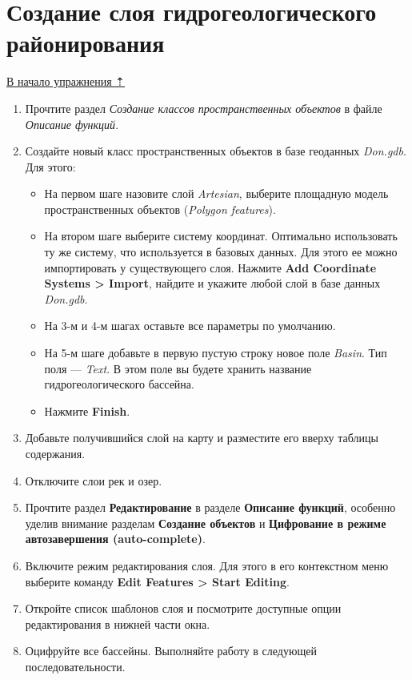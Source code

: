 \documentclass[]{book}
\theoremstyle{definition}
\theoremstyle{definition}
\theoremstyle{definition}
\theoremstyle{remark}
\begin{document}
\hypertarget{map-ref-hydrogeologic-regions}{%
\section{Создание слоя гидрогеологического
районирования}\label{map-ref-hydrogeologic-regions}}

\protect\hyperlink{map-ref-hydrogeologic}{В начало упражнения ⇡}

\begin{enumerate}
\def\labelenumi{\arabic{enumi}.}
\item
  Прочтите раздел \emph{Создание классов пространственных объектов} в
  файле \emph{Описание функций}.
\item
  Создайте новый класс пространственных объектов в базе геоданных
  \emph{Don.gdb}. Для этого:

  \begin{itemize}
  \item
    На первом шаге назовите слой \emph{Artesian}, выберите площадную
    модель пространственных объектов (\emph{Polygon features}).
  \item
    На втором шаге выберите систему координат. Оптимально использовать
    ту же систему, что используется в базовых данных. Для этого ее можно
    импортировать у существующего слоя. Нажмите \textbf{Add Coordinate
    Systems \textgreater{} Import}, найдите и укажите любой слой в базе
    данных \emph{Don.gdb}.
  \item
    На 3-м и 4-м шагах оставьте все параметры по умолчанию.
  \item
    На 5-м шаге добавьте в первую пустую строку новое поле \emph{Basin}.
    Тип поля --- \emph{Text}. В этом поле вы будете хранить название
    гидрогеологического бассейна.
  \item
    Нажмите \textbf{Finish}.
  \end{itemize}
\item
  Добавьте получившийся слой на карту и разместите его вверху таблицы
  содержания.
\item
  Отключите слои рек и озер.
\item
  Прочтите раздел \textbf{Редактирование} в разделе \textbf{Описание
  функций}, особенно уделив внимание разделам \textbf{Создание объектов}
  и \textbf{Цифрование в режиме автозавершения (auto-complete)}.
\item
  Включите режим редактирования слоя. Для этого в его контекстном меню
  выберите команду \textbf{Edit Features \textgreater{} Start Editing}.
\item
  Откройте список шаблонов слоя и посмотрите доступные опции
  редактирования в нижней части окна.
\item
  Оцифруйте все бассейны. Выполняйте работу в следующей
  последовательности.


\end{enumerate}
\end{document}

